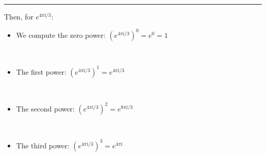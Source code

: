 \documentclass[11pt]{article}
\providecommand{\tightlist}{%
      \setlength{\itemsep}{0pt}\setlength{\parskip}{0pt}}
\begin{document}
    \begin{center}
    \end{center}
    { \hspace*{\fill} \\}
    
    \begin{center}\rule{0.5\linewidth}{0.5pt}\end{center}

    Then, for \(e^{4\pi\mathrm{i}/3}\):

\begin{itemize}
\tightlist
\item
  We compute the zero power: \((e^{4\pi\mathrm{i}/3})^0 = e^0 = 1\)
\end{itemize}

    \begin{center}
    \end{center}
    { \hspace*{\fill} \\}
    
    \begin{itemize}
\tightlist
\item
  The first power: \((e^{4\pi\mathrm{i}/3})^1 = e^{4\pi\mathrm{i}/3}\)
\end{itemize}

    \begin{center}
    \end{center}
    { \hspace*{\fill} \\}
    
    \begin{itemize}
\tightlist
\item
  The second power: \((e^{4\pi\mathrm{i}/3})^2 = e^{8\pi\mathrm{i}/3}\)
\end{itemize}

    \begin{center}
    \end{center}
    { \hspace*{\fill} \\}
    
    \begin{itemize}
\tightlist
\item
  The third power: \((e^{4\pi\mathrm{i}/3})^3 = e^{4\pi\mathrm{i}}\)
\end{itemize}
\end{document}
